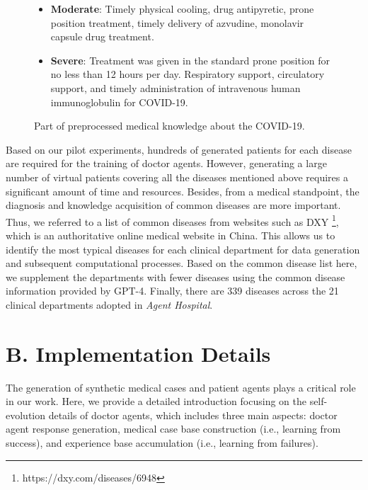 \documentclass[fleqn,12pt]{wlscirep}
\begin{document}
\begin{figure}[H]
\begin{mdframed}[innerleftmargin=10pt,innerrightmargin=10pt]
\begin{itemize}[leftmargin=2em,    %
                itemsep=0.5em,    %
                topsep=0.5em,     %
                parsep=0pt,       %
                labelsep=0.5em]
    \item \textbf{Moderate}: Timely physical cooling, drug antipyretic, prone position treatment, timely delivery of azvudine, monolavir capsule drug treatment.
    \item \textbf{Severe}: Treatment was given in the standard prone position for no less than 12 hours per day. Respiratory support, circulatory support, and timely administration of intravenous human immunoglobulin for COVID-19.
\end{itemize}
\end{mdframed}
\caption{Part of preprocessed medical knowledge about the COVID-19.}
\label{fig:COVID-19 data information}
\end{figure}
\FloatBarrier

Based on our pilot experiments, hundreds of generated patients for each disease are required for the training of doctor agents. However, generating a large number of virtual patients covering all the diseases mentioned above requires a significant amount of time and resources. Besides, from a medical standpoint, the diagnosis and knowledge acquisition of common diseases are more important. Thus, we referred to a list of common diseases from websites such as DXY \footnote{https://dxy.com/diseases/6948}, which is an authoritative online medical website in China. This allows us to identify the most typical diseases for each clinical department for data generation and subsequent computational processes. Based on the common disease list here, we supplement the departments with fewer diseases using the common disease information provided by GPT-4. Finally, there are 339 diseases across the 21 clinical departments adopted in \textit{Agent Hospital}.

\section*{B. Implementation Details}
The generation of synthetic medical cases and patient agents plays a critical role in our work. Here, we provide a detailed introduction focusing on the self-evolution details of doctor agents, which includes three main aspects: doctor agent response generation, medical case base construction (i.e., learning from success), and experience base accumulation (i.e., learning from failures). 
\end{document}
